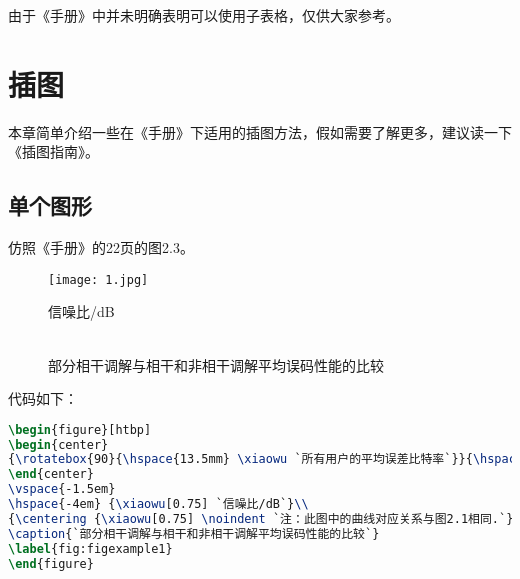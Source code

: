 由于《手册》中并未明确表明可以使用子表格，仅供大家参考。

\section{插图}
本章简单介绍一些在《手册》下适用的插图方法，假如需要了解更多，建议读一下《\LaTeXe 插图指南》\textsuperscript{\cite{graphics}}。

\subsection{单个图形}
仿照《手册》的22页的图2.3。

\begin{figure}[htbp]
\begin{center}
{}{\hspace{15mm}\texttt{[image: 1.jpg]}}{\hspace*{20mm}}
\end{center}
\vspace{-1.5em}
\hspace{-4em} {\xiaowu[0.75] 信噪比/dB}\\
{\\}
\caption{部分相干调解与相干和非相干调解平均误码性能的比较}
\label{fig:figexample1}
\end{figure}

代码如下：

\begin{lstlisting}[language=TeX]
\begin{figure}[htbp]
\begin{center}
{\rotatebox{90}{\hspace{13.5mm} \xiaowu `所有用户的平均误差比特率`}}{\hspace{15mm}\texttt{[image: 1.jpg]}}{\hspace*{20mm}}
\end{center}
\vspace{-1.5em}
\hspace{-4em} {\xiaowu[0.75] `信噪比/dB`}\\
{\centering {\xiaowu[0.75] \noindent `注：此图中的曲线对应关系与图2.1相同.`}\\}
\caption{`部分相干调解与相干和非相干调解平均误码性能的比较`}
\label{fig:figexample1}
\end{figure}
\end{lstlisting}

